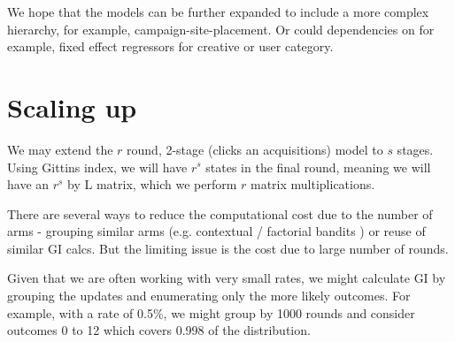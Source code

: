 \documentclass[11pt,a4,singlespacing,titlepagenumber=on]{scrreprt}
\numberwithin{equation}{chapter} %
\theoremstyle{remark}
\begin{document}
We hope that the models can be further expanded to include a more complex hierarchy, for example, campaign-site-placement. Or could dependencies on for example, fixed effect regressors for creative or user category.

\section{Scaling up}

We may extend the $r$ round, 2-stage (clicks an acquisitions) model to $s$ stages. Using Gittins index, we will have $r^s$ states in the final round, meaning we will have an $r^s$ by L matrix, which we perform $r$ matrix multiplications.

There are several ways to reduce the computational cost due to the number of arms - grouping similar arms (e.g. contextual / factorial bandits ) or reuse of similar GI calcs. But the limiting issue is the cost due to large number of rounds.

Given that we are often working with very small rates, we might calculate GI by grouping the updates and enumerating only the more likely outcomes. For example, with a rate of 0.5\%, we might group by 1000 rounds and consider outcomes 0 to 12 which covers 0.998 of the distribution. 
















\cleardoublepage
{}
\end{document}
